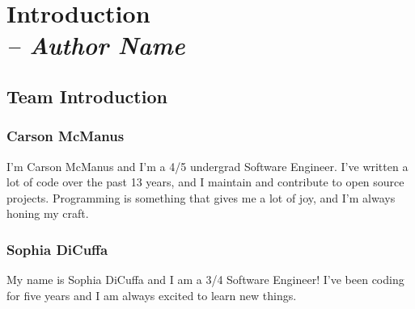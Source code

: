 \chapter{Introduction \\
  \small{\textit{-- Author Name}}
  \label{Chapter::Introduction}}

\section{Team Introduction \label{Section::TeamIntroduction}}

\subsection{Carson McManus}

I'm Carson McManus and I'm a 4/5 undergrad Software Engineer. I've written a lot of code over the past 13 years, and I maintain and contribute to open source projects. Programming is something that gives me a lot of joy, and I'm always honing my craft.

\subsection{Sophia DiCuffa}

My name is Sophia DiCuffa and I am a 3/4 Software Engineer! I've been coding for five years and I am always excited to learn new things.